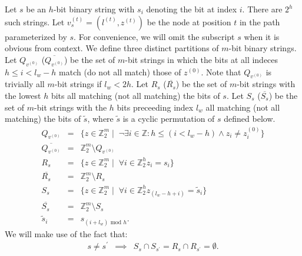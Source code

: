 \documentclass{sig-alternate-05-2015}
\newcommand{\beq}{\begin{eqnarray}}
\newcommand{\eeq}{\end{eqnarray}}
\begin{document}
Let $s$ be an $h$-bit binary string with $s_i$ denoting the bit at index $i$.
There are $2^h$ such strings.
Let $v_s^{(t)} = (l^{(t)}, z^{(t)})$ be the node at position $t$
in the path parameterized by $s$.
For convenience,
we will omit the subscript $s$ when it is obvious from context.
We define three distinct partitions of $m$-bit binary strings.
Let $Q_{v^{(0)}}$ ($\overline{Q_{v^{(0)}}}$) be the set of $m$-bit
strings in which the bits at
all indeces $h \leq i < l_w - h$ match (do not all match) those of $z^{(0)}$.
Note that $Q_{v^{(0)}}$ is trivially all $m$-bit strings if $l_w < 2h$.
Let $R_s$ ($\overline{R_s}$) be the set of $m$-bit strings with the lowest $h$
bits all matching (not all matching) the bits of $s$.
Let $S_s$ ($\overline{S_s}$) be the set of $m$-bit strings with the $h$ bits
preceeding index $l_w$ all matching (not all matching) the bits of $\tilde{s}$,
where $\tilde{s}$ is a cyclic permutation of $s$ defined below.
\beq
Q_{v^{(0)}} &=&
\{z \in \mathbb{Z}_2^m \mid \;
\neg \exists i \in \mathbb{Z} : h \leq (i < l_w - h) \land z_i \neq z_i^{(0)} \}
\\
\overline{Q_{v^{(0)}}} &=& \mathbb{Z}_2^m \setminus Q_{v^{(0)}}
\\
R_s &=&
\{z \in \mathbb{Z}_{2}^m \mid \;
\forall i \in \mathbb{Z}_2^h z_i = s_i \}
\\
\overline{R_s} &=& \mathbb{Z}_2^m \setminus R_s
\\
S_s &=&
\{z \in \mathbb{Z}_{2}^m \mid \;
\forall i \in \mathbb{Z}_2^h z_{(l_w - h + i)} = \tilde{s}_i \}
\\
\overline{S_s} &=& \mathbb{Z}_2^m \setminus S_s
\\
\tilde{s}_i &=& s_{(i + l_w) \text{ mod } h}.
\eeq
We will make use of the fact that:
\beq
s \neq s^\prime &\implies&
S_s \cap S_{s^\prime} = R_s \cap R_{s^\prime} = \emptyset.
\eeq
\end{document}
